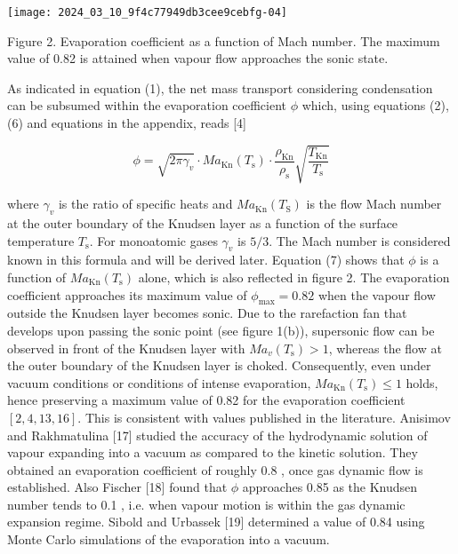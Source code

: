 \documentclass[10pt]{article}
\begin{document}
\begin{center}
\texttt{[image: 2024\_03\_10\_9f4c77949db3cee9cebfg-04]}
\end{center}

Figure 2. Evaporation coefficient as a function of Mach number. The maximum value of 0.82 is attained when vapour flow approaches the sonic state.

As indicated in equation (1), the net mass transport considering condensation can be subsumed within the evaporation coefficient $\phi$ which, using equations (2), (6) and equations in the appendix, reads [4]


\begin{equation*}
\phi=\sqrt{2 \pi \gamma_{v}} \cdot M a_{\mathrm{Kn}}\left(T_{\mathrm{s}}\right) \cdot \frac{\rho_{\mathrm{Kn}}}{\rho_{\mathrm{s}}} \sqrt{\frac{T_{\mathrm{Kn}}}{T_{\mathrm{s}}}} \tag{7}
\end{equation*}


where $\gamma_{v}$ is the ratio of specific heats and $M a_{\mathrm{Kn}}\left(T_{\mathrm{S}}\right)$ is the flow Mach number at the outer boundary of the Knudsen layer as a function of the surface temperature $T_{\mathrm{s}}$. For monoatomic gases $\gamma_{v}$ is $5 / 3$. The Mach number is considered known in this formula and will be derived later. Equation (7) shows that $\phi$ is a function of $M a_{\mathrm{Kn}}\left(T_{\mathrm{s}}\right)$ alone, which is also reflected in figure 2. The evaporation coefficient approaches its maximum value of $\phi_{\max }=0.82$ when the vapour flow outside the Knudsen layer becomes sonic. Due to the rarefaction fan that develops upon passing the sonic point (see figure 1(b)), supersonic flow can be observed in front of the Knudsen layer with $M a_{v}\left(T_{\mathrm{s}}\right)>1$, whereas the flow at the outer boundary of the Knudsen layer is choked. Consequently, even under vacuum conditions or conditions of intense evaporation, $M a_{\mathrm{Kn}}\left(T_{\mathrm{s}}\right) \leqslant 1$ holds, hence preserving a maximum value of 0.82 for the evaporation coefficient $[2,4,13,16]$. This is consistent with values published in the literature. Anisimov and Rakhmatulina [17] studied the accuracy of the hydrodynamic solution of vapour expanding into a vacuum as compared to the kinetic solution. They obtained an evaporation coefficient of roughly 0.8 , once gas dynamic flow is established. Also Fischer [18] found that $\phi$ approaches 0.85 as the Knudsen number tends to 0.1 , i.e. when vapour motion is within the gas dynamic expansion regime. Sibold and Urbassek [19] determined a value of 0.84 using Monte Carlo simulations of the evaporation into a vacuum.
\end{document}
